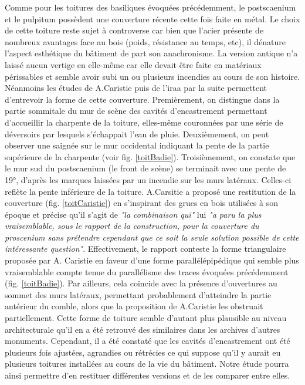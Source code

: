 		Comme pour les toitures des \glspl{basilique} évoquées précédemment, le \gls{postscaenium} et le \gls{pulpitum} possèdent une couverture récente cette fois faite en métal. Le choix de cette toiture reste sujet à controverse car bien que l'acier présente de nombreux avantages face au bois (poids, résistance au temps, etc), il dénature l'aspect esthétique du bâtiment de part son anachronisme. La version antique n'a laissé aucun vertige en elle-même car elle devait être faite en matériaux périssables et semble avoir subi un ou plusieurs incendies au cours de son histoire. Néanmoins les études de A.Caristie puis de l'\gls{iraa} par la suite permettent d'entrevoir la forme de cette couverture. Premièrement, on distingue dans la partie sommitale du mur de scène des cavités d'encastrement permettant d'accueillir la charpente de la toiture, elles-même couronnées par une série de déversoirs par lesquels s’échappait l’eau de pluie. Deuxièmement, on peut observer une saignée sur le mur occidental indiquant la pente de la partie supérieure de la charpente (voir fig. \ref{toitBadie}). Troisièmement, on constate que le mur sud du \gls{postscaenium} (le front de scène) se terminait avec une pente de 19°, d'après les marques laissées par un incendie sur les murs latéraux. Celles-ci reflète la pente inférieure de la toiture. A.Carsitie a proposé une restitution de la couverture (fig. \ref{toitCaristie}) en s'inspirant des grues en bois utilisées à son époque et précise qu'il s'agit de \textit{"la combinaison qui"} lui \textit{"a paru la plus vraisemblable, sous le rapport de la construction, pour la couverture du proscenium sans prétendre cependant que ce soit la seule solution possible de cette intéressante question"}. Effectivement, le rapport \cite{orangeTxt} conteste la forme triangulaire proposée par A. Caristie en faveur d'une forme parallélépipédique qui semble plus vraisemblable compte tenue du parallélisme des traces évoquées précédemment (fig. \ref{toitBadie}). Par ailleurs, cela coïncide avec la présence d'ouvertures au sommet des murs latéraux, permettant probablement d'atteindre la partie antérieur du comble, alors que la proposition de A.Caristie les obstruait partiellement. Cette forme de toiture semble d'autant plus plausible au niveau architecturale qu'il en a été retrouvé des similaires dans les archives d'autres monuments. Cependant, il a été constaté que les cavités d'encastrement ont été plusieurs fois ajustées, agrandies ou rétrécies ce qui suppose qu'il y aurait eu plusieurs toitures installées au cours de la vie du bâtiment. Notre étude pourra ainsi permettre d'en restituer différentes versions et de les comparer entre elles.
		
